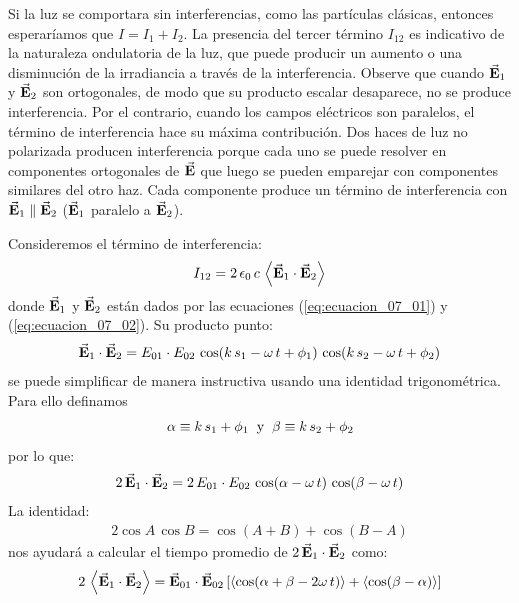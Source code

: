\documentclass[14pt]{extarticle}
\begin{document}
Si la luz se comportara sin interferencias, como las partículas clásicas, entonces esperaríamos que $I = I_{1} + I_{2}$. La presencia del tercer término $I_{12}$ es indicativo de la naturaleza ondulatoria de la luz, que puede producir un aumento o una disminución de la irradiancia a través de la interferencia. Observe que cuando $\va{E}_{1}$ y $\va{E}_{2}$ son ortogonales, de modo que su producto escalar desaparece, no se produce interferencia. Por el contrario, cuando los campos eléctricos son paralelos, el término de interferencia hace su máxima contribución. Dos haces de luz no polarizada producen interferencia porque cada uno se puede resolver en componentes ortogonales de $\va{E}$ que luego se pueden emparejar con componentes similares del otro haz. Cada componente produce un término de interferencia con $\va{E}_{1} \parallel \va{E}_{2}$ ($\va{E}_{1}$ paralelo a $\va{E}_{2}$).
\par
Consideremos el término de interferencia:
\begin{align}
I_{12} = 2 \, \epsilon_{0} \, c \, \expval{ \va{E}_{1} \cdot \va{E}_{2}}
\label{eq:ecuacion_07_06}
\end{align}
donde $\va{E}_{1}$ y $\va{E}_{2}$ están dados por las ecuaciones (\ref{eq:ecuacion_07_01}) y (\ref{eq:ecuacion_07_02}). Su producto punto:
\begin{align*}
\va{E}_{1} \cdot \va{E}_{2} = E_{01} \cdot E_{02} \, \cos (k \, s_{1} - \omega \, t + \phi_{1}) \, \cos (k \, s_{2} - \omega \, t + \phi_{2})
\end{align*}
se puede simplificar de manera instructiva usando una identidad trigonométrica. Para ello definamos
\begin{align*}
\alpha \equiv k \, s_{1} + \phi_{1} \hspace{0.2cm} \text{y} \hspace{0.2cm} \beta \equiv k \, s_{2} + \phi_{2}
\end{align*}
por lo que:
\begin{align*}
2 \, \va{E}_{1} \cdot \va{E}_{2} = 2 \, E_{01} \cdot E_{02} \, \cos(\alpha - \omega \, t) \, \cos(\beta - \omega \, t)
\end{align*}
La identidad:
\begin{align*}
2 \cos A \, \cos B = \cos (A + B) + \cos (B - A)
\end{align*}
nos ayudará a calcular el tiempo promedio de $2 \, \va{E}_{1} \cdot \va{E}_{2}$ como:
\begin{align*}
2 \, \expval{\va{E}_{1} \cdot \va{E}_{2}} = \va{E}_{01} \cdot \va{E}_{02} \left[ \expval{\cos (\alpha + \beta - 2 \omega \, t)} + \expval{\cos (\beta - \alpha)} \right]
\end{align*}
\end{document}
